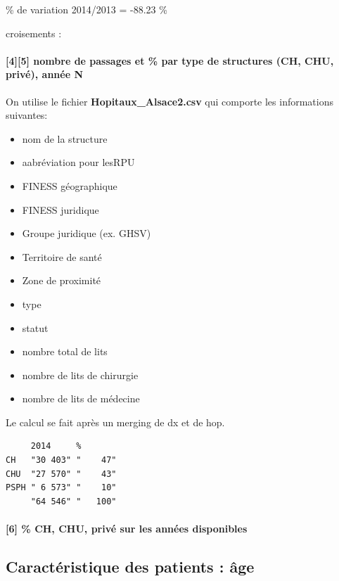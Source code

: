 \documentclass[]{article}
\begin{document}
\% de variation 2014/2013 = -88.23 \%

croisements :

\paragraph{{[}4{]}{[}5{]} nombre de passages et \% par type de
structures (CH, CHU, privé), année
N}\label{nombre-de-passages-et-par-type-de-structures-ch-chu-prive-annee-n}

On utilise le fichier \textbf{Hopitaux\_Alsace2.csv} qui comporte les
informations suivantes:

\begin{itemize}
\itemsep1pt\parskip0pt
\item
  nom de la structure
\item
  aabréviation pour lesRPU
\item
  FINESS géographique
\item
  FINESS juridique
\item
  Groupe juridique (ex. GHSV)
\item
  Territoire de santé
\item
  Zone de proximité
\item
  type
\item
  statut
\item
  nombre total de lits
\item
  nombre de lits de chirurgie
\item
  nombre de lits de médecine
\end{itemize}

Le calcul se fait après un merging de dx et de hop.

\begin{verbatim}
     2014     %       
CH   "30 403" "    47"
CHU  "27 570" "    43"
PSPH " 6 573" "    10"
     "64 546" "   100"
\end{verbatim}

\paragraph{{[}6{]} \% CH, CHU, privé sur les années
disponibles}\label{ch-chu-prive-sur-les-annees-disponibles}

\subsection{Caractéristique des patients :
âge}\label{caracteristique-des-patients-age}
\end{document}
